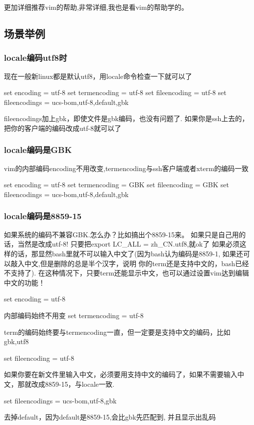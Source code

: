 \documentclass[adobefonts]{ctexart}
\begin{document}
更加详细推荐vim的帮助,非常详细,我也是看vim的帮助学的。

\subsection{场景举例}
\subsubsection{locale编码utf8时}
现在一般新linux都是默认utf8，用locale命令检查一下就可以了

set encoding = utf-8
set termencoding = utf-8
set fileencoding = utf-8
set fileencodings = ucs-bom,utf-8,default,gbk

fileencodings加上gbk，即使文件是gbk编码，也没有问题了.
如果你是ssh上去的，把你的客户端的编码改成utf-8就可以了

\subsubsection{locale编码是GBK}
vim的内部编码encoding不用改变,termencoding与ssh客户端或者xterm的编码一致

set encoding = utf-8
set termencoding = GBK
set fileencoding = GBK
set fileencodings = ucs-bom,utf-8,default,gbk

\subsubsection{locale编码是8859-15}
如果系统的编码不兼容GBK.怎么办？比如搞出个8859-15来。
如果只是自己用的话，当然是改成utf-8! 只要把export LC\_ALL = zh\_CN.utf8,就ok了
如果必须这样的话，那显然bash里就不可以输入中文了(因为bash认为编码是8859-1, 如果还可以敲入中文,但是删除的总是半个汉字，说明
你的term还是支持中文的，bash已经不支持了). 在这种情况下，只要term还能显示中文，也可以通过设置vim达到编辑中文的功能！

set encoding = utf-8

内部编码始终不用变
set termencoding = utf-8

term的编码始终要与termencoding一直，但一定要是支持中文的编码，比如gbk,utf8 

set fileencoding = utf-8

如果你要在新文件里输入中文，必须要用支持中文的编码了，如果不需要输入中文，那就改成8859-15，与locale一致.

set fileencodings = ucs-bom,utf-8,gbk

去掉default，因为default是8859-15,会比gbk先匹配到, 并且显示出乱码
\end{document}
